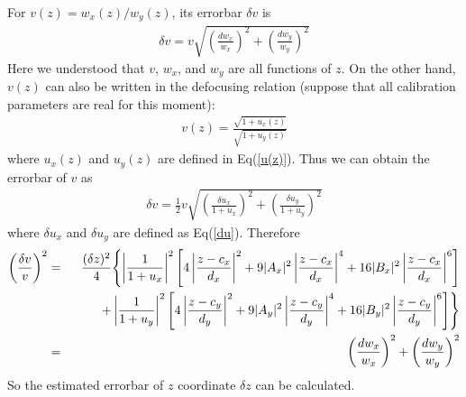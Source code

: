 \documentclass[12pt]{article}
\def\bea{\begin{eqnarray}}
\def\eea{\end{eqnarray}}
\def\Eq#1{Eq(\ref{#1})}
\begin{document}
For $v(z) = w_x(z)/w_y(z)$, its errorbar $\delta v$ is
\bea\label{dv1}
\delta v = v\sqrt{ \left(\frac{dw_x}{w_x}\right)^2 +
		   \left(\frac{dw_y}{w_y}\right)^2 }
\eea
Here we understood that $v$, $w_x$, and $w_y$ are all functions of $z$.
On the other hand, $v(z)$ can also be written in the defocusing relation
(suppose that all calibration parameters are real for this moment):
\bea
v(z) = \frac{\sqrt{1+u_x(z)}}{\sqrt{1+u_y(z)}}
\eea
where $u_x(z)$ and $u_y(z)$ are defined in \Eq{u(z)}. Thus we can
obtain the errorbar of $v$ as
\bea\label{dv2}
\delta v = \frac{1}{2} v \sqrt{
	\left(\frac{\delta u_x}{1+u_x}\right)^2 +
	\left(\frac{\delta u_y}{1+u_y}\right)^2 }
\eea
where $\delta u_x$ and $\delta u_y$ are defined as \Eq{du}. Therefore
\bea
\left(\frac{\delta v}{v}\right)^2 &=& \frac{(\delta z)^2}{4}\Biggl\{
	\left|\frac{1}{1+u_x}\right|^2\left[
	4\left|\frac{z-c_x}{d_x}\right|^2 +
	9|A_x|^2\left|\frac{z-c_x}{d_x}\right|^4 +
	16 |B_x|^2\left|\frac{z-c_x}{d_x}\right|^6 \right]
\nonumber\\ && \hspace{8mm} +
	\left|\frac{1}{1+u_y}\right|^2\left[
	4\left|\frac{z-c_y}{d_y}\right|^2 +
	9|A_y|^2\left|\frac{z-c_y}{d_y}\right|^4 +
	16 |B_y|^2\left|\frac{z-c_y}{d_y}\right|^6 \right]
	\Biggr\}
\nonumber\\ &=&
	\left(\frac{dw_x}{w_x}\right)^2 + \left(\frac{dw_y}{w_y}\right)^2
\eea
So the estimated errorbar of $z$ coordinate $\delta z$ can be calculated.
\end{document}

